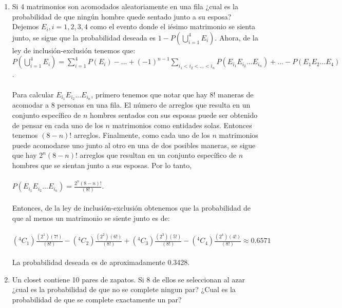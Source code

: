 \documentclass[12pt,a4paper]{report}
\newcommand*{\Comb}[2]{{}^{#1}C_{#2}}
\begin{document}
\begin{enumerate}
{  }


  \item{
Si 4 matrimonios son acomodados aleatoriamente en una fila ¿cual es la probabilidad de que ningún hombre quede sentado junto a su esposa?\\

Dejemos $E_{i}, i= 1,2,3,4$ como el evento donde el iésimo matrimonio se sienta junto, se sigue que la probabilidad deseada es $1 - P(\bigcup\limits_{i=1}^{4}E_{i})$. Ahora, de la ley de inclusión-exclusión tenemos que:
\\$P(\bigcup\limits_{i=1}^{4}E_{i}) = \sum_{i=1}^{4} P(E_{i}) - ... + (-1)^{n-1}\sum_{i_{1} < i_{2} < ... < i_{n}}P(E_{i_{1}}E_{i_{2}}...E_{i_{n}}) + ... - P(E_{1}E_{2}...E_{4})$.\\
\\Para calcular $E_{i_{1}}E_{i_{2}}...E_{i_{n}}$, primero tenemos que notar que hay 8! maneras de acomodar a 8 personas en una fila. El número de arreglos que resulta en un conjunto específico de $n$ hombres sentados con sus esposas puede ser obtenido de pensar en cada uno de los $n$ matrimonios como entidades solas. Entonces tenemos $(8-n)!$ arreglos. Finalmente, como cada uno de los $n$ matrimonios puede acomodarse uno junto al otro en una de dos posibles maneras, se sigue que hay $2^n(8-n)!$ arreglos que resultan en un conjunto específico de $n$ hombres que se sientan junto a sus esposas. Por lo tanto,\\
\\$P(E_{i_{1}}E_{i_{2}}...E_{i_{n}}) = \frac{2^n(8-n)!}{(8!)}$.\\
\\Entonces, de la ley de inclusión-exclusión obtenemos que la probabilidad de que al menos un matrimonio se siente junto es de:\\
\\$ (\Comb{4}{1})\frac{(2^1)(7!)}{(8!)} - (\Comb{4}{2})\frac{(2^2)(6!)}{(8!)} + (\Comb{4}{3})\frac{(2^3)(5!)}{(8!)} - (\Comb{4}{4})\frac{(2^4)(4!)}{(8!)} \approx 0.6571$\\
\\La probabilidad deseada es de aproximadamente 0.3428.

  }

  \item{
Un closet contiene 10 pares de zapatos. Si 8 de ellos se seleccionan al azar ¿cual es la probabilidad de que no se complete ningun par? ¿Cual es la probabilidad de que se complete exactamente un par?
  }


\end{enumerate}
\end{document}
